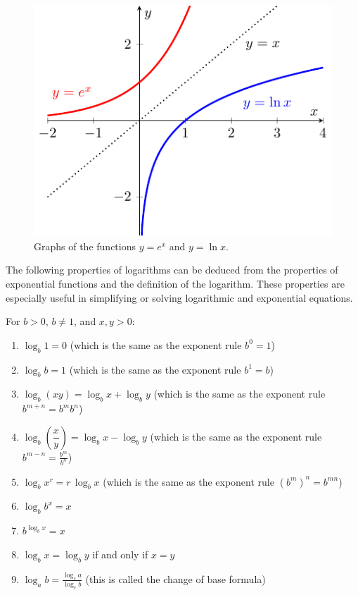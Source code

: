 \begin{figure}[ht!]     
	\begin{center}         
        \includegraphics[width=0.5\columnwidth]{figures/0-4-fig1.pdf}
	\end{center}     
\caption{Graphs of the functions $y=e^{x}$ and $y=\ln{x}$.}     
\label{F:0.4.Ex1} 
\end{figure}

The following properties of logarithms can be deduced from the properties of exponential functions and the definition of the logarithm.  These properties are especially useful in simplifying or solving logarithmic and exponential equations.
\begin{theorem}
For $b>0$, $b \ne 1$, and $x,y>0$:
\begin{enumerate}
\item $\log_{b}1=0$ \quad (which is the same as the exponent rule $b^0 = 1$)
\item $\log_{b}b=1$ \quad (which is the same as the exponent rule $b^1 = b$)
\item $\log_{b}\left(xy\right)=\log_{b}x+\log_{b}y$ \quad (which is the same as the
    exponent rule $b^{m+n} = b^mb^n$)
\item $\log_{b}\left(\dfrac{x}{y}\right)=\log_{b}x-\log_{b}y$ \quad (which is the same as the
    exponent rule $b^{m-n} = \frac{b^m}{b^n}$)
\item $\log_{b}x^{r}=r\,\log_{b}x$ \quad (which is the same as the exponent rule $(b^m)^n
    = b^{mn}$)
\item $\log_{b}b^{x}=x$
\item $b^{\log_{b}x}=x$
\item $\log_{b}x=\log_{b}y$ if and only if $x=y$
\item $\log_a b = \frac{\log_c a}{\log_c b}$ \quad (this is called the change of base formula)
\end{enumerate}
\end{theorem}

